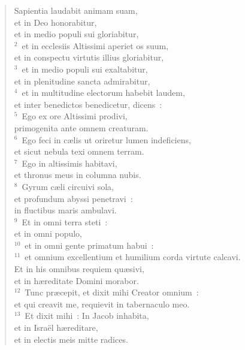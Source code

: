 \begin{flushleft}\begin{verse}\vspace{-19pt}\hspace{6pt}Sapientia laudabit animam suam,\\\hspace{6pt} et in Deo honorabitur,\\ et in medio populi sui gloriabitur,\\
${}^{2}$~et in ecclesiis Altissimi aperiet os suum,\\ et in conspectu virtutis illius gloriabitur,\\
${}^{3}$~et in medio populi sui exaltabitur,\\ et in plenitudine sancta admirabitur,\\
${}^{4}$~et in multitudine electorum habebit laudem,\\ et inter benedictos benedicetur, dicens~:\\
${}^{5}$~Ego ex ore Altissimi prodivi,\\ primogenita ante omnem creaturam.\\
${}^{6}$~Ego feci in c\ae lis ut oriretur lumen indeficiens,\\ et sicut nebula texi omnem terram.\\
${}^{7}$~Ego in altissimis habitavi,\\ et thronus meus in columna nubis.\\
${}^{8}$~Gyrum c\ae li circuivi sola,\\ et profundum abyssi penetravi~:\\ in fluctibus maris ambulavi.\\
${}^{9}$~Et in omni terra steti~:\\ et in omni populo,\\
${}^{10}$~et in omni gente primatum habui~:\\
${}^{11}$~et omnium excellentium et humilium corda virtute calcavi.\\ Et in his omnibus requiem qu\ae sivi,\\ et in h\ae reditate Domini morabor.\\
${}^{12}$~Tunc pr\ae cepit, et dixit mihi Creator omnium~:\\ et qui creavit me, requievit in tabernaculo meo.\\
${}^{13}$~Et dixit mihi~: In Jacob inhabita,\\ et in Isra\"el h\ae reditare,\\ et in electis meis mitte radices.\end{verse}\end{flushleft}


